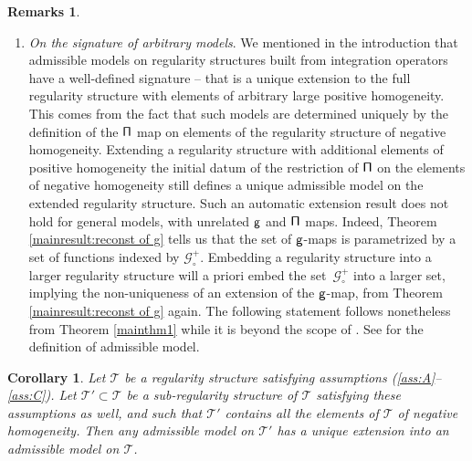 \documentclass[10pt]{amsart}
\theoremstyle{plain}
\newtheorem{cor}[thm]{Corollary}
\theoremstyle{definition}
\newtheorem*{remarks*} {Remarks}
\newcommand{\scrT}{\mathscr{T}}
\newcommand{\bbR}{\mathbb{R}}
\newcommand{\bbZ}{\mathbb{Z}}
\newcommand{\mcG}{\mathcal{G}}
\begin{document}
\begin{remarks*}
\begin{enumerate}
(Theorem \ref{mainthm1} cannot be applied in a finite region $[0,T]$ directly. To overcome this point, we extend a function $f\in C([0,T], \bbR^\ell)$ to $[-T,T]$ symmetrically, and extend it to $\big[(2n-1)T, (2n+1)T\big]$ for any $n\in\bbZ$ periodically. Then for any $\alpha\in(0,1)$, the Hölder space $C^\alpha([0,T],\bbR^\ell)$ is identified with the space
\[
C_{p,s}^\alpha(\bbR, \bbR^\ell) := \Big\{ f\in C^\alpha(\bbR,\bbR^\ell)\,;\, f(t)=f(-t),\ f(t+2T)=f(t)\ \text{for any $t\in \bbR$} \Big\}.
\]
Note that Littlewood-Paley blocks $\Delta_i$ preserve the symmetry and periodicity, so such spaces are closed under paradifferential operators (paraproduct, its two-parameter extension, etc.) used in this paper. Hence we can apply Theorem \ref{mainthm1} to such spaces.)

\item
\emph{On the signature of arbitrary models}. We mentioned in the introduction that admissible models on regularity structures built from integration operators have a well-defined signature -- that is a unique extension to the full regularity structure with elements of arbitrary large positive homogeneity. This comes from the fact that such models are determined uniquely by the definition of the $\sf \Pi$ map on elements of the regularity structure of negative homogeneity. Extending a regularity structure with additional elements of positive homogeneity the initial datum of the restriction of $\sf \Pi$ on the elements of negative homogeneity still defines a unique admissible model on the extended regularity structure. Such an automatic extension result does not hold for general models, with unrelated $\sf g$ and $\sf \Pi$ maps. Indeed, Theorem \ref{mainresult:reconst of g} tells us that the set of $\sf g$-maps is parametrized by a set of functions indexed by $\mcG^+_\circ$. Embedding a regularity structure into a larger regularity structure will a priori embed the set~$\mcG^+_\circ$ into a larger set, implying the non-uniqueness of an extension of the $\sf g$-map, from Theorem \ref{mainresult:reconst of g} again. The following statement follows nonetheless from Theorem \ref{mainthm1} while it is beyond the scope of \cite[Th.\,21]{BH}. See \cite[\S4]{BH} for the definition of admissible model.
\end{enumerate}
\end{remarks*}

\begin{cor}
Let $\scrT$ be a regularity structure satisfying assumptions \textup{(\ref{ass:A}--\ref{ass:C})}. Let $\scrT'\subset\scrT$ be a sub-regularity structure of $\scrT$ satisfying these assumptions as well, and such that $\scrT'$ contains all the elements of $\scrT$ of negative homogeneity. Then any admissible model on $\scrT'$ has a unique extension into an admissible model on $\scrT$.
\end{cor}
\end{document}
